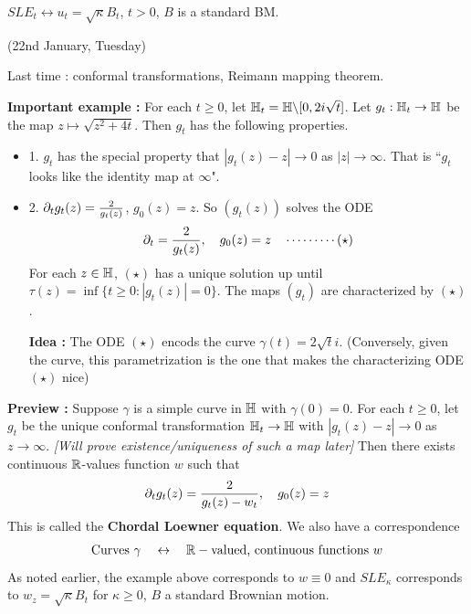 \documentclass[12pt,a4paper]{article}
\renewenvironment{i}
{\begin{itemize} 
	}%
	{\end{itemize}
}
\begin{document}
$SLE_t \leftrightarrow u_t = \sqrt{\kappa} B_t$, $t>0$, $B$ is a standard BM.
\s

\newday

(22nd January, Tuesday)
\s

Last time : conformal transformations, Reimann mapping theorem.
\s

\textbf{Important example :} For each $t\geq 0$, let $\mathbb{H}_t =\mathbb{H} \backslash [0, 2i\sqrt{t}]$. Let $g_t: \mathbb{H}_t \rightarrow \mathbb{H}$ be the map $z\mapsto \sqrt{z^2 + 4t}$. Then $g_t$ has the following properties.
\begin{i}
\item[1.] $g_t$ has the special property that $|g_t(z) - z| \rightarrow 0$ as $|z| \rightarrow \infty$. That is ``$g_t$ looks like the identity map at $\infty$".
\item[2.] $\partial_t g_t(z) = \frac{2}{g_t(z)}$, $g_0(z) = z$. So $(g_t(z))$ solves the ODE
\begin{align*}
\partial_t = \frac{2}{g_t(z)}, \quad g_0(z) = z \quad \cdots\cdots\cdots (\star)
\end{align*}
For each $z\in \mathbb{H}$, $(\star)$ has a unique solution up until $\tau(z) = \inf \{t\geq 0: |g_t(z)|=0 \}$. The maps $(g_t)$ are characterized by $(\star)$.
\s

\textbf{Idea :} The ODE $(\star)$ encods the curve $\gamma(t) = 2\sqrt{t} i$. (Conversely, given the curve, this parametrization is the one that makes the characterizing ODE $(\star)$ nice)
\end{i}
\s
 
\textbf{Preview :} Suppose $\gamma$ is a simple curve in $\mathbb{H}$ with $\gamma(0)=0$. For each $t\geq 0$, let $g_t$ be the unique conformal transformation $\mathbb{H}_t \rightarrow \mathbb{H}$ with $|g_t(z)- z| \rightarrow 0$ as $z\rightarrow \infty$. \emph{[Will prove existence/uniqueness of such a map later]} Then there exists continuous $\mathbb{R}$-values function $w$ such that
\begin{align*}
\partial_t g_t(z) = \frac{2}{g_t(z) - w_t}, \quad g_0(z) =z
\end{align*}
This is called the \textbf{Chordal Loewner equation}. We also have a correspondence
\begin{align*}
\text{Curves } \gamma \quad \leftrightarrow \quad \mathbb{R}-\text{valued, continuous functions } w
\end{align*}
As noted earlier, the example above corresponds to $w\equiv 0$ and $SLE_{\kappa}$ corresponds to $w_z = \sqrt{\kappa} B_t$ for $\kappa \geq 0$, $B$ a standard Brownian motion.
\s
\end{document}
